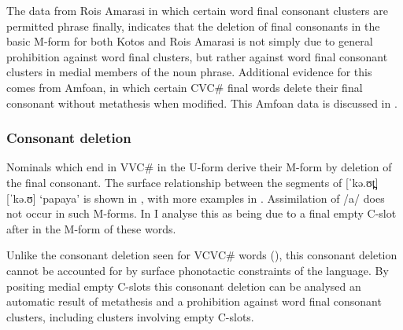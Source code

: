 The data from Ro{\Q}is Amarasi in which certain
word final consonant clusters are permitted phrase finally,
indicates that the deletion of final consonants in the basic M-form
for both Kotos and Ro{\Q}is Amarasi is not simply due to general prohibition
against word final clusters, but rather against
word final consonant clusters in medial members of the noun phrase.
Additional evidence for this comes from Amfo{\Q}an,
in which certain CVC{\#} final words delete their
final consonant without metathesis when modified.
This Amfo{\Q}an data is discussed in .

\subsubsection{Consonant deletion}\label{sec:ConDel}
Nominals which end in VVC{\#} in the U-form derive their
M-form by deletion of the final consonant.
The surface relationship between the segments of
 [ˈkə.ʊt̪] {\ra}  [ˈkə.ʊ] `papaya' is shown in ,
with more examples in .
Assimilation of /a/ does not occur in such M-forms.
In  I analyse this as being due to
a final empty C-slot after in the M-form of these words.

\begin{exe}
	\label{as:kaut/kau} 
	\label{ex:VVC->VV}
	\stl{0.4em}\gw{}
\end{exe}

Unlike the consonant deletion seen for VCVC{\#} words (),
this consonant deletion cannot be accounted for by surface phonotactic constraints of the language.
By positing medial empty C-slots this consonant deletion
can be analysed an automatic result of metathesis
and a prohibition against word final consonant clusters,
including clusters involving empty C-slots.
